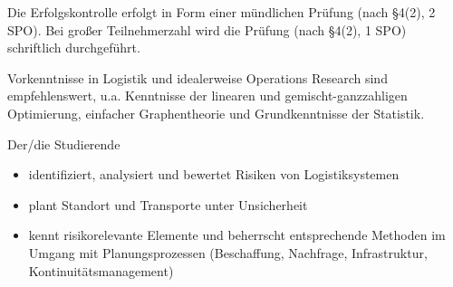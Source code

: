 \begin{course}

\setdoclanguagegerman
{}



\coursehead


\label{cour_7063.dp_997}


\begin{styleenv}
\begin{assessment}
Die Erfolgskontrolle erfolgt in Form einer mündlichen Prüfung (nach §4(2), 2 SPO). Bei großer Teilnehmerzahl wird die Prüfung (nach §4(2), 1 SPO) schriftlich durchgeführt.


\end{assessment}

\begin{conditions}Vorkenntnisse in Logistik und idealerweise Operations Research sind empfehlenswert, u.a. Kenntnisse der linearen und gemischt-ganzzahligen Optimierung, einfacher Graphentheorie und Grundkenntnisse der Statistik.

\end{conditions}


\end{styleenv}

\begin{learningoutcomes}
Der/die Studierende

 \begin{itemize}\item identifiziert, analysiert und bewertet Risiken von Logistiksystemen  \item plant Standort und Transporte unter Unsicherheit  \item kennt risikorelevante Elemente und beherrscht entsprechende Methoden im Umgang mit Planungsprozessen (Beschaffung, Nachfrage, Infrastruktur, Kontinuitätsmanagement)  \end{itemize}
\end{learningoutcomes}


\end{course}
